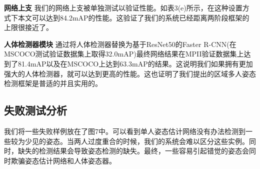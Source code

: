 \textbf{网络上支} 我们的网络上支被单独测试以验证性能。如表3(e)所示，在这种设置方式下本文可以达到84.2mAP的性能。这验证了我们的系统已经距离两阶段框架的上限很接近了。

\textbf{人体检测器模块} 通过将人体检测器替换为基于ResNet50的Faster R-CNN(在MSCOCO测试验证数据集上取得32.0mAP)最终网络结果在MPII验证数据集上达到了81.4mAP以及在MSCOCO上达到63.3mAP的结果。这说明我们如果拥有更加强大的人体检测器，就可以达到更高的性能。这也证明了我们提出的区域多人姿态检测框架是普适的并且实用的。

\subsection*{失败测试分析}
我们将一些失败样例放在了图7中。可以看到单人姿态估计网络没有办法检测到一些较为少见的姿态。当两人过度重合的时候，我们的系统会难以区分这些实例。同时，缺失的检测结果会导致姿态检测的缺失。最终，一些容易引起错觉的姿态会同时欺骗姿态估计网络和人体姿态器。

